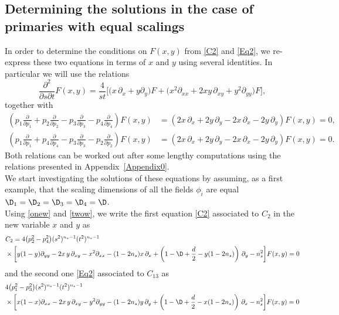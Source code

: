\documentclass[a4paper,11pt,openright,twoside]{book}
\newcommand{\appref}[1]{Appendix~\ref{#1}}		%
\numberwithin{equation}{section}
\begin{document}
{\subsection{Determining the solutions in the case of primaries with equal scalings}
In order to determine the conditions on $F(x,y)$ from \eqref{C2} and \eqref{Eq2},  we re-express these two equations in terms of $x$ and $y$ using several identities. In particular we will use the relations 
\begin{equation}
	\frac{\partial^2}{\partial s\partial t}F(x,y)=\frac{4}{st}\big[\big(
	x\,\partial_x +y\partial_y\big)F+\big(x^2\partial_{xx}+2xy\,\partial_{xy}+y^2\partial_{yy}\big)F\big],
	\label{onew}
\end{equation}
together with
\begin{align}
	\left(p_1\frac{\partial}{\partial p_1}+p_2\frac{\partial}{\partial p_2}-p_3\frac{\partial}{\partial p_3}-p_4\frac{\partial}{\partial p_4}\right)F(x,y)&=\left(2x\,\partial_x+2y\,\partial_y -2x\,\partial_x-2y\,\partial_y\right)F(x,y)=0,\\[1.5ex]
	\left(p_1\frac{\partial}{\partial p_1}+p_4\frac{\partial}{\partial p_4}-p_3\frac{\partial}{\partial p_3}-p_2\frac{\partial}{\partial p_2}\right)F(x,y)&=\left(2x\,\partial_x+2y\,\partial_y -2x\,\partial_x-2y\,\partial_y\right)F(x,y)=0.
	\label{twow}
\end{align}
Both relations can be worked out after some lengthy computations using the relations presented in \appref{Appendix0}. \\
We start investigating the solutions of these equations by assuming, as a first example, that the scaling dimensions of all the fields $\phi_i$ are  equal $\D_1=\D_2=\D_3=\D_4=\D$.\\
Using \eqref{onew} and \eqref{twow}, we write the first equation \eqref{C2} associated to $C_2$ in the new variable $x$ and $y$ as
\begin{align}
	&C_2= 4\big(p_2^2-p_4^2\big)(s^2)^{n_s-1}(t^2)^{n_s-1}\notag\\
	&\times\bigg[y(1-y)\partial_{yy} -2x\,y\,\partial_{xy}-x^2\partial_{xx}-(1-2n_s)x\,\partial_x+\left(1-\D+\frac{d}{2}-y(1-2n_s)\right)\,\partial_y-n_s^2\bigg] F(x,y)=0\label{first}
\end{align}
and the second one \eqref{Eq2} associated to $C_{13}$ as
\begin{align}
	&4\big(p_1^2-p_3^2\big)(s^2)^{n_s-1}(t^2)^{n_s-1}\notag\\
	&\times\bigg[x(1-x)\partial_{xx} -2x\,y\,\partial_{xy}-y^2\partial_{yy}-(1-2n_s)y\,\partial_y+\left(1-\D+\frac{d}{2}-x(1-2n_s)\right)\,\partial_x-n_s^2\bigg] F(x,y)=0\label{second}

\end{align}}
\end{document}
